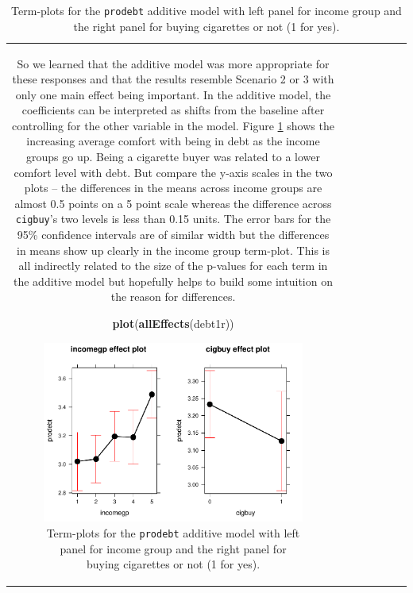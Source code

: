 \documentclass[]{book}
\newenvironment{Shaded}{\begin{snugshade}}{\end{snugshade}}
\newcommand{\KeywordTok}[1]{\textcolor[rgb]{0.13,0.29,0.53}{\textbf{#1}}}
\newcommand{\NormalTok}[1]{#1}
\theoremstyle{definition}
\theoremstyle{definition}
\theoremstyle{remark}
\begin{document}
\begin{longtable}[]{@{}ccccccc@{}}
\begin{minipage}[b]{0.10\columnwidth}
\begin{Shaded}
\begin{Highlighting}[]
\begin{Shaded}
\begin{Highlighting}[]
\begin{Shaded}
\begin{Highlighting}[]
\begin{Shaded}
\begin{Highlighting}[]
\begin{Shaded}
\begin{Highlighting}[]
So we learned that the additive model was more appropriate for these
responses and that the results resemble Scenario 2 or 3 with only one
main effect being important. In the additive model, the coefficients can
be interpreted as shifts from the baseline after controlling for the
other variable in the model. Figure \ref{fig:Figure4-15} shows the
increasing average comfort with being in debt as the income groups go
up. Being a cigarette buyer was related to a lower comfort level with
debt. But compare the y-axis scales in the two plots -- the differences
in the means across income groups are almost 0.5 points on a 5 point
scale whereas the difference across \texttt{cigbuy}'s two levels is less
than 0.15 units. The error bars for the 95\% confidence intervals are of
similar width but the differences in means show up clearly in the income
group term-plot. This is all indirectly related to the size of the
p-values for each term in the additive model but hopefully helps to
build some intuition on the reason for differences.





\begin{Shaded}
\begin{Highlighting}[]
\KeywordTok{plot}\NormalTok{(}\KeywordTok{allEffects}\NormalTok{(debt1r))}
\end{Highlighting}
\end{Shaded}

\begin{figure}
\centering
\includegraphics{04-twoWayAnova_files/figure-latex/Figure4-15-1.pdf}
\caption{\label{fig:Figure4-15}Term-plots for the \texttt{prodebt} additive model with
left panel for income group and the right panel for buying cigarettes or
not (1 for yes).}
\end{figure}


\end{Highlighting}
\end{Shaded}
\end{Highlighting}
\end{Shaded}
\end{Highlighting}
\end{Shaded}
\end{Highlighting}
\end{Shaded}
\end{Highlighting}
\end{Shaded}
\end{minipage}
\end{longtable}
\end{document}
